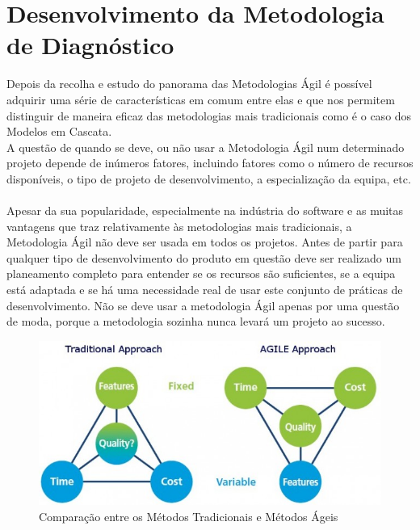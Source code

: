 \chapter{Desenvolvimento da Metodologia de Diagnóstico}
\label{cht:projetoagil}

Depois da recolha e estudo do panorama das Metodologias Ágil é possível adquirir uma série de características em comum entre elas e que nos permitem distinguir de maneira eficaz das metodologias mais tradicionais como é o caso dos Modelos em Cascata.
\\A questão de quando se deve, ou não usar a Metodologia Ágil num determinado projeto depende de inúmeros fatores, incluindo fatores como o número de recursos disponíveis, o tipo de projeto de desenvolvimento, a especialização da equipa, etc.
\\
\\Apesar da sua popularidade, especialmente na indústria do software e as muitas vantagens que traz relativamente às metodologias mais tradicionais, a Metodologia Ágil não deve ser usada em todos os projetos. Antes de partir para qualquer tipo de desenvolvimento do produto em questão deve ser realizado um planeamento completo para entender se os recursos são suficientes, se a equipa está adaptada e se há uma necessidade real de usar este conjunto de práticas de desenvolvimento. Não se deve usar a metodologia Ágil apenas por uma questão de moda, porque a metodologia sozinha nunca levará um projeto ao sucesso.
\vspace{10mm}

\begin{figure}[H]
    \centering
    \includegraphics[scale=0.7]{Imagens/Traditional-Vs-Agile-e1409736279325.jpg}
    \caption{Comparação entre os Métodos Tradicionais e Métodos Ágeis}
    \label{fig:compta}
\end{figure}


\newpage

